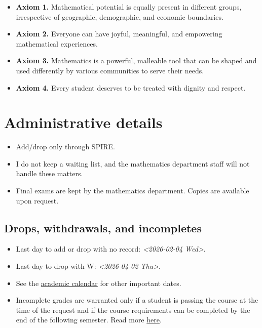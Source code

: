 \documentclass[11pt]{article}
\begin{document}
\begin{itemize}
\item \textbf{Axiom 1.} Mathematical potential is equally present in different groups,
irrespective of geographic, demographic, and economic boundaries.

\item \textbf{Axiom 2.} Everyone can have joyful, meaningful, and empowering mathematical
experiences.

\item \textbf{Axiom 3.} Mathematics is a powerful, malleable tool that can be shaped and
used differently by various communities to serve their needs.

\item \textbf{Axiom 4.} Every student deserves to be treated with dignity and respect.
\end{itemize}

\section*{Administrative details}
\label{sec:org8c84445}
\begin{itemize}
\item Add/drop only through SPIRE.
\item I do not keep a waiting list, and the mathematics department staff will not
handle these matters.
\item Final exams are kept by the mathematics department. Copies are available upon
request.
\end{itemize}

\subsection*{Drops, withdrawals, and incompletes}
\label{sec:org85495ec}
\begin{itemize}
\item Last day to add or drop with no record: \textit{<2026-02-04 Wed>}.
\item Last day to drop with W: \textit{<2026-04-02 Thu>}.
\item See the \href{https://www.umass.edu/registrar/academic-calendar}{academic calendar} for other important dates.
\item Incomplete grades are warranted only if a student is passing the course at the
time of the request and if the course requirements can be completed by the
end of the following semester. Read more \href{https://www.umass.edu/natural-sciences/advising/petitions-and-forms/incomplete-grade-form}{here}.
\end{itemize}
\end{document}
